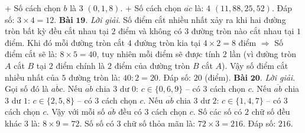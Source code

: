 \begin{multicols}{2}
	\vskip 0.1cm
	+ Số cách chọn $b$ là $3$ $(0,1,8)$.
	\vskip 0.1cm
	+ Số cách chọn $\overline{ac}$ là: $4$ $(11, 88,25, 52)$.
	\vskip 0.1cm
	Đáp số: $3\times 4=12$.
	\vskip 0.1cm
	\textbf{\color{cackithi}Bài} $\pmb{19.}$ \textit{Lời giải}. Số điểm cắt nhiều nhất xảy ra khi hai đường tròn bất kỳ đều cắt nhau tại $2$ điểm và không có $3$ đường tròn nào cắt nhau tại $1$ điểm. Khi đó mỗi đường tròn cắt $4$ đường tròn kia tại $4\times 2=8$ điểm $\Rightarrow$ Số điểm cắt sẽ là: $8\times 5 = 40$, tuy nhiên mỗi điểm sẽ được tính $2$ lần (vì đường tròn $A$ cắt $B$ tại $2$ điểm chính là $2$ điểm của đường tròn $B$ cắt $A$). Vậy số điểm cắt nhiều nhất của $5$ đường tròn là: $40:2 = 20$.
	\vskip 0.1cm
	Đáp số: $20$ (điểm).
	\vskip 0.1cm
	\textbf{\color{cackithi}Bài} $\pmb{20.}$ \textit{Lời giải}. 
	Gọi số đó là $\overline{abc}$.
	\vskip 0.1cm
	Nếu $\overline{ab}$ chia $3$ dư $0$: $c\in \{0,6,9\}$ -- có $3$ cách chọn $c$.
	\vskip 0.1cm  
	Nếu $\overline{ab}$ chia $3$ dư $1$: $c\in \{2,5,8\}$ -- có $3$ cách chọn $c$.
	\vskip 0.1cm  
	Nếu $\overline{ab}$ chia $3$ dư $2$: $c\in \{1,4,7\}$ -- có $3$ cách chọn $c$.
	\vskip 0.1cm  
	Vậy với mỗi số $\overline{ab}$ đều có $3$ cách chọn $c$. Số các số có $2$ chữ số đều khác $3$ là: $8\times9=72$.
	\vskip 0.1cm
	Số số có $3$ chữ số thỏa mãn là: $72\times 3=216$.
	\vskip 0.1cm
	Đáp số: $216$. 
\end{multicols}
\newpage
\begingroup
{}
